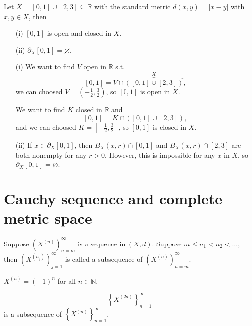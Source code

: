 \begin{eg}
    Let \(X = [0, 1] \cup [2, 3] \subseteq \mathbb{R} \) with the standard metric \(d(x,y) = \vert x-y \vert \) with \(x,y \in X\), then 
    \begin{itemize}
        \item [(i)] \([0, 1]\) is open and closed in \(X\). 
        \item [(ii)] \(\partial _X [0, 1] = \varnothing \).  
    \end{itemize}  
\end{eg}
\begin{explanation}
    \vphantom{text}
    \begin{itemize}
        \item [(i)] We want to find \(V\) open in \(\mathbb{R} \) s.t.
    \[
        [0, 1] = V \cap \overbrace{([0, 1] \cup [2, 3])}^{X},
    \]  we can choosed \(V = \left( -\frac{1}{2}, \frac{3}{2} \right) \), so \([0, 1]\) is open in \(X\). 
    
    We want to find \(K\) closed in \(\mathbb{R} \) and 
    \[
        [0, 1] = K \cap \left( [0, 1] \cup [2, 3] \right),
    \]and we can choosed \(K = \left[ -\frac{1}{2}, \frac{3}{2}\right] \), so \([0, 1]\) is closed in \(X\).
        \item [(ii)] If \(x \in \partial _X [0, 1]\), then \(B_X(x, r) \cap [0, 1]\) and \(B_X(x, r) \cap [2, 3]\) are both nonempty for any \(r>0\). However, this is impossible for any \(x\) in \(X\), so \(\partial _X[0, 1] = \varnothing \).  
    \end{itemize}
\end{explanation}
\section{Cauchy sequence and complete metric space}
\begin{definition}[subsequence]
    Suppose \(\left( X^{(n)} \right)_{n=m}^{\infty}  \) is a sequence in \((X, d)\). Suppose \(m \le n_1 < n_2 < \dots \), then \(\left( X^{(n_j)} \right)_{j=1}^{\infty}  \) is called a subsequence of \(\left( X^{(n)} \right)_{n=m}^{\infty}  \).   
\end{definition}

\begin{eg}
    \(X^{(n)} = (-1)^n\) for all \(n \in \mathbb{N} \).  
\end{eg}
\begin{explanation}
    \[
        \left\{ X^{(2n)} \right\}_{n=1}^{\infty } 
    \]is a subsequence of \(\left\{ X^{(n)} \right\}_{n=1}^{\infty}  \). 
\end{explanation}

